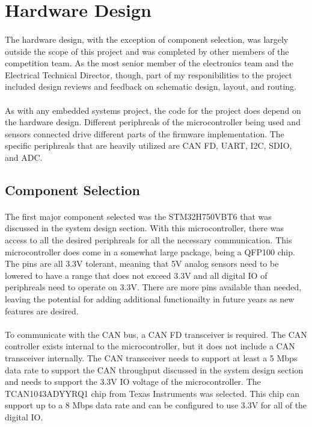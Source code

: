 \section{Hardware Design}

\paragraph{}
The hardware design, with the exception of component selection, was largely outside the scope of this project and was completed by other members of the competition team.
As the most senior member of the electronics team and the Electrical Technical Director, though, part of my responibilities to the project included design reviews and feedback on schematic design, layout, and routing.

\paragraph{}
As with any embedded systems project, the code for the project does depend on the hardware design.
Different periphreals of the microcontroller being used and sensors connected drive different parts of the firmware implementation.
The specific periphreals that are heavily utilized are CAN FD, UART, I2C, SDIO, and ADC.

\subsection{Component Selection}

\paragraph{}
The first major component selected was the STM32H750VBT6 that was discussed in the system design section.
With this microcontroller, there was access to all the desired periphreals for all the necessary communication.
This microcontroller does come in a somewhat large package, being a QFP100 chip.
The pins are all 3.3V tolerant, meaning that 5V analog sensors need to be lowered to have a range that does not exceed 3.3V and all digital IO of periphreals need to operate on 3.3V.
There are more pins available than needed, leaving the potential for adding additional functionailty in future years as new features are desired.

\paragraph{}
To communicate with the CAN bus, a CAN FD transceiver is required.
The CAN controller exists internal to the microcontroller, but it does not include a CAN transceiver internally.
The CAN transceiver needs to support at least a 5 Mbps data rate to support the CAN throughput discussed in the system design section and needs to support the 3.3V IO voltage of the microcontroller.
The TCAN1043ADYYRQ1 chip from Texas Instruments \cite{CANProductPage} was selected.
This chip can support up to a 8 Mbps data rate and can be configured to use 3.3V for all of the digital IO.

